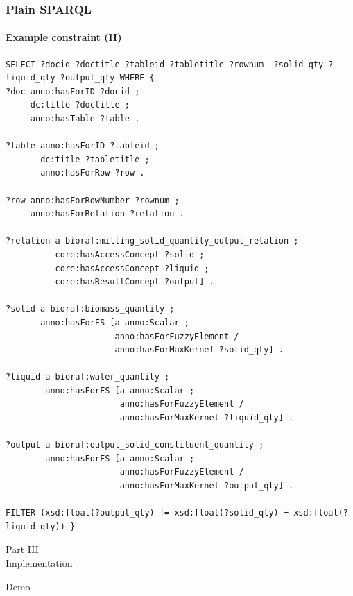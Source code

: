 \documentclass{beamer}
\newcommand{\partslide}[2]{
  \begin{center}
    \LARGE{#1} \\
    \vspace{0.5cm}
    \huge{#2}
  \end{center}
}
\begin{document}
\begin{frame}[fragile]
  \frametitle{Plain SPARQL}
  \framesubtitle{Example constraint (II)}

  \begin{Verbatim}[fontsize=\tiny]
SELECT ?docid ?doctitle ?tableid ?tabletitle ?rownum  ?solid_qty ?liquid_qty ?output_qty WHERE {
?doc anno:hasForID ?docid ;
     dc:title ?doctitle ;
     anno:hasTable ?table .

?table anno:hasForID ?tableid ;
       dc:title ?tabletitle ;
       anno:hasForRow ?row .

?row anno:hasForRowNumber ?rownum ;
     anno:hasForRelation ?relation .

?relation a bioraf:milling_solid_quantity_output_relation ;
          core:hasAccessConcept ?solid ;
          core:hasAccessConcept ?liquid ;
          core:hasResultConcept ?output] .

?solid a bioraf:biomass_quantity ;
       anno:hasForFS [a anno:Scalar ;
                      anno:hasForFuzzyElement /
                      anno:hasForMaxKernel ?solid_qty] .

?liquid a bioraf:water_quantity ;
        anno:hasForFS [a anno:Scalar ;
                       anno:hasForFuzzyElement /
                       anno:hasForMaxKernel ?liquid_qty] .

?output a bioraf:output_solid_constituent_quantity ;
        anno:hasForFS [a anno:Scalar ;
                       anno:hasForFuzzyElement /
                       anno:hasForMaxKernel ?output_qty] .

FILTER (xsd:float(?output_qty) != xsd:float(?solid_qty) + xsd:float(?liquid_qty)) }
  \end{Verbatim}
\end{frame}


\begin{frame}
  \partslide{Part III}{Implementation}
\end{frame}

\begin{frame}
  \begin{center}
    \Huge{Demo}
  \end{center}
\end{frame}
\end{document}
